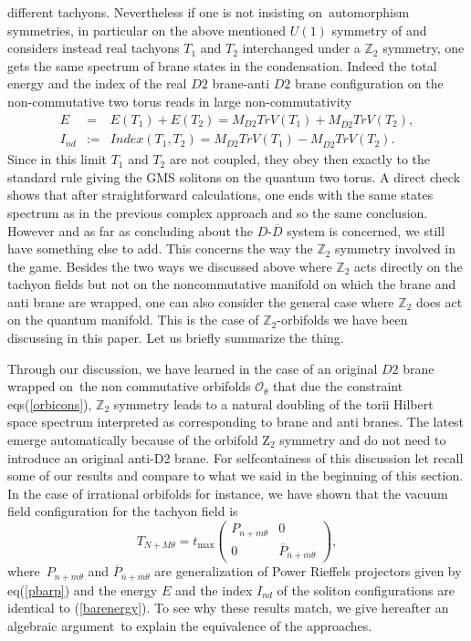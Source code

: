\documentclass[a4paper,12pt]{article}
\begin{document}
different tachyons. Nevertheless if one is not insisting on\
automorphism symmetries, in particular on the above mentioned
$U(1)$ symmetry of \cite{g} and considers
instead real tachyons $T_{1}$ and $T_{2}$ interchanged under a $\mathbb{Z}%
_{2}$ symmetry, one gets the same spectrum of brane states in the
condensation. Indeed the total energy and the index of the real
$D2$ brane-anti $D2$ brane configuration on the non-commutative
two torus reads in large non-commutativity
\begin{eqnarray*}
E &=&E(T_{1})+E(T_{2})=M_{D2}TrV(T_{1})+M_{\overline{D2}}TrV(T_{2}), \\
I_{nd} &:=&Index(T_{1},T_{2})=M_{D2}TrV(T_{1})-M_{\overline{D2}}TrV(T_{2}).
\end{eqnarray*}
Since in this limit $T_{1}$ and $T_{2}$ are not coupled, they obey then
exactly to the standard rule giving the GMS solitons on the quantum two
torus. A direct check shows that after straightforward calculations, one
ends with the same states spectrum as in the previous complex approach and
so the same conclusion. However and as far as concluding about the $D$-$%
\overline{D}$ system is concerned, we still have something else to add. This
concerns the way the $\mathbb{Z}_{2}$ symmetry involved in the game. Besides
the two ways we discussed above where $\mathbb{Z}_{2}$ acts directly on the
tachyon fields but not on the noncommutative manifold on which the brane and
anti brane are wrapped, one can also consider the general case where $%
\mathbb{Z}_{2}$ does act on the quantum manifold. This is the case of $%
\mathbb{Z}_{2}$-orbifolds we have been discussing in this paper.
Let us briefly summarize the thing.

Through our discussion, we have learned in the case of an original
$D2$ brane wrapped on\ the non commutative orbifolds
$\mathcal{O}_{\theta }$ that due the constraint
eqs(\ref{orbicons}), $\mathbb{Z}_{2}$ symmetry leads to a natural
doubling of the torii Hilbert space spectrum interpreted as
corresponding to brane and anti branes. The latest emerge
automatically because of the orbifold Z$_{2}$ symmetry and do not
need to introduce an original anti-D2 brane. For selfcontainess of
this discussion let recall some of our results and compare to what
we said in the beginning of this section. In the case of
irrational orbifolds for instance, we have shown that the vacuum
field configuration for the tachyon field is
\begin{equation*}
T_{N+M\theta }=t_{\text{max}}\left(
\begin{array}{cc}
P_{n+m\theta } & 0 \\
0 & \overline{P}_{\overline{n}+\overline{m}\theta }
\end{array}
\right) ,
\end{equation*}
where{\small \ }$P_{n+m\theta }$ and $\overline{P}_{\overline{n}+\overline{m}%
\theta }$ are generalization of Power Rieffels projectors given by
eq(\ref{pbarp}) and the energy $E$ and the index $I_{nd}$ of the
soliton configurations are identical to (\ref{barenergy}). To see
why these results match, we give hereafter an algebraic argument\
to explain the equivalence of the approaches.
\end{document}
